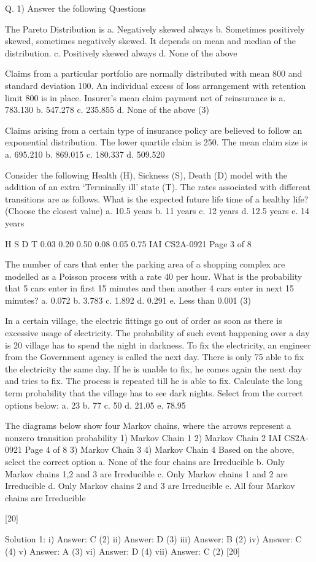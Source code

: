 Q. 1) Answer the following Questions
\item The Pareto Distribution is
a. Negatively skewed always
b. Sometimes positively skewed, sometimes negatively skewed. It depends on mean and
median of the distribution.
c. Positively skewed always
d. None of the above

\item Claims from a particular portfolio are normally distributed with mean 800 and
standard deviation 100. An individual excess of loss arrangement with retention limit
800 is in place. Insurer’s mean claim payment net of reinsurance is
a. 783.130
b. 547.278
c. 235.855
d. None of the above
(3)
\item Claims arising from a certain type of insurance policy are believed to follow an
exponential distribution. The lower quartile claim is 250. The mean claim size is
a. 695.210
b. 869.015
c. 180.337
d. 509.520

\item Consider the following Health (H), Sickness (S), Death (D) model with the addition
of an extra ‘Terminally ill’ state (T). The rates associated with different transitions are
as follows.
What is the expected future life time of a healthy life? (Choose the closest value)
a. 10.5 years
b. 11 years
c. 12 years
d. 12.5 years
e. 14 years

H S
D T
0.03
0.20
0.50
0.08
0.05
0.75
IAI CS2A-0921
Page 3 of 8
\item The number of cars that enter the parking area of a shopping complex are modelled as
a Poisson process with a rate 40 per hour. What is the probability that 5 cars enter in
first 15 minutes and then another 4 cars enter in next 15 minutes?
a. 0.072%
b. 3.783%
c. 1.892%
d. 0.291%
e. Less than 0.001%
(3)
\item In a certain village, the electric fittings go out of order as soon as there is excessive
usage of electricity. The probability of such event happening over a day is 20%
village has to spend the night in darkness. To fix the electricity, an engineer from the
Government agency is called the next day. There is only 75%
able to fix the electricity the same day. If he is unable to fix, he comes again the next
day and tries to fix. The process is repeated till he is able to fix.
Calculate the long term probability that the village has to see dark nights. Select from the
correct options below:
a. 23%
b. 77%
c. 50%
d. 21.05%
e. 78.95%

\item The diagrams below show four Markov chains, where the arrows represent a nonzero
transition probability
1) Markov Chain 1
2) Markov Chain 2
IAI CS2A-0921
Page 4 of 8
3) Markov Chain 3
4) Markov Chain 4
Based on the above, select the correct option
a. None of the four chains are Irreducible
b. Only Markov chains 1,2 and 3 are Irreducible
c. Only Markov chains 1 and 2 are Irreducible
d. Only Markov chains 2 and 3 are Irreducible
e. All four Markov chains are Irreducible

[20]

Solution 1:
i)
Answer: C
(2)
ii)
Answer: D
(3)
iii)
Answer: B
(2)
iv)
Answer: C
(4)
v)
Answer: A
(3)
vi)
Answer: D
(4)
vii)
Answer: C
(2)
[20]

